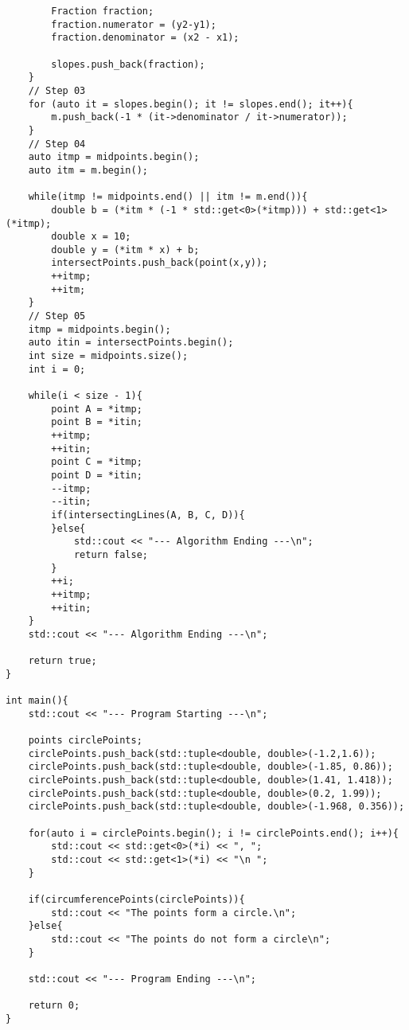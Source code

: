 \documentclass[12pt]{amsart}
\begin{document}
\begin{lstlisting}
        Fraction fraction;
        fraction.numerator = (y2-y1);
        fraction.denominator = (x2 - x1);

        slopes.push_back(fraction);
    }
    // Step 03
    for (auto it = slopes.begin(); it != slopes.end(); it++){
        m.push_back(-1 * (it->denominator / it->numerator));
    }
    // Step 04
    auto itmp = midpoints.begin();
    auto itm = m.begin();

    while(itmp != midpoints.end() || itm != m.end()){
        double b = (*itm * (-1 * std::get<0>(*itmp))) + std::get<1>(*itmp);
        double x = 10;
        double y = (*itm * x) + b;
        intersectPoints.push_back(point(x,y));
        ++itmp;
        ++itm;
    }
    // Step 05
    itmp = midpoints.begin();
    auto itin = intersectPoints.begin();
    int size = midpoints.size();
    int i = 0;

    while(i < size - 1){
        point A = *itmp;
        point B = *itin;
        ++itmp;
        ++itin;
        point C = *itmp;
        point D = *itin;
        --itmp;
        --itin;
        if(intersectingLines(A, B, C, D)){
        }else{
            std::cout << "--- Algorithm Ending ---\n";
            return false;
        }
        ++i;
        ++itmp;
        ++itin;
    }
    std::cout << "--- Algorithm Ending ---\n";

    return true;
}

int main(){
    std::cout << "--- Program Starting ---\n";

    points circlePoints;
    circlePoints.push_back(std::tuple<double, double>(-1.2,1.6));
    circlePoints.push_back(std::tuple<double, double>(-1.85, 0.86));
    circlePoints.push_back(std::tuple<double, double>(1.41, 1.418));
    circlePoints.push_back(std::tuple<double, double>(0.2, 1.99));
    circlePoints.push_back(std::tuple<double, double>(-1.968, 0.356));

    for(auto i = circlePoints.begin(); i != circlePoints.end(); i++){
        std::cout << std::get<0>(*i) << ", ";
        std::cout << std::get<1>(*i) << "\n ";
    }

    if(circumferencePoints(circlePoints)){
        std::cout << "The points form a circle.\n";
    }else{
        std::cout << "The points do not form a circle\n";
    }
    
    std::cout << "--- Program Ending ---\n";
    
    return 0;
}
\end{lstlisting}
\end{document}
